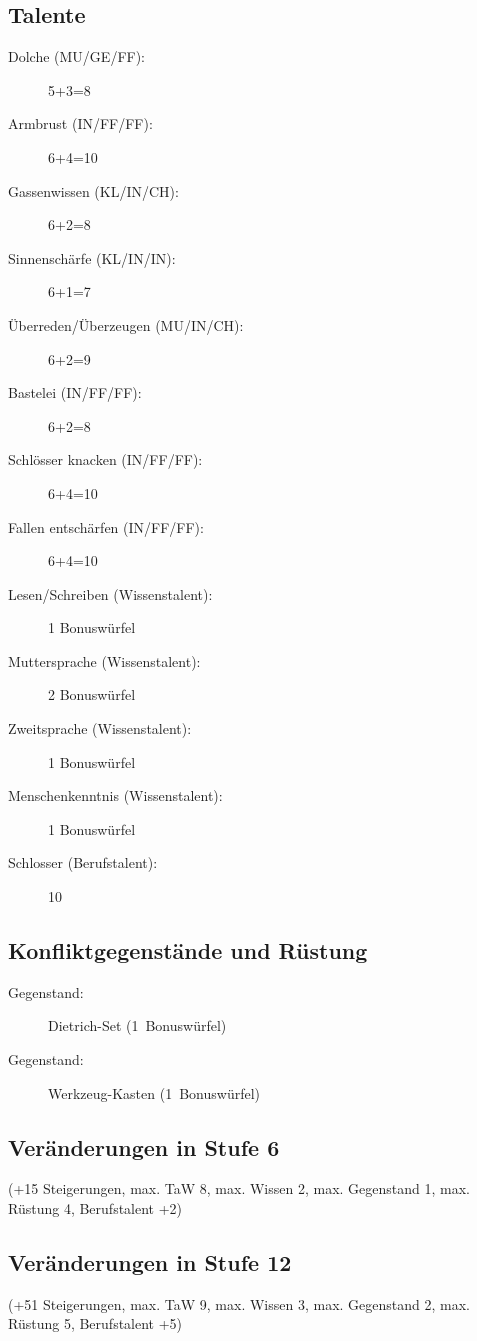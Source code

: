 \subsection{Talente}
\begin{description}
\item[Dolche (MU/GE/FF):] 5+3=8
\item[Armbrust (IN/FF/FF):] 6+4=10
\item[Gassenwissen (KL/IN/CH):] 6+2=8
\item[Sinnenschärfe (KL/IN/IN):] 6+1=7
\item[Überreden/Überzeugen (MU/IN/CH):] 6+2=9
\item[Bastelei (IN/FF/FF):] 6+2=8
\item[Schlösser knacken (IN/FF/FF):] 6+4=10
\item[Fallen entschärfen (IN/FF/FF):] 6+4=10
\item[Lesen/Schreiben (Wissenstalent):] 1 Bonuswürfel
\item[Muttersprache (Wissenstalent):] 2 Bonuswürfel
\item[Zweitsprache (Wissenstalent):] 1 Bonuswürfel
\item[Menschenkenntnis (Wissenstalent):] 1 Bonuswürfel
\item[Schlosser (Berufstalent):] 10
\end{description}

\subsection{Konfliktgegenstände und Rüstung}
\begin{description}
\item[Gegenstand:] Dietrich-Set (1~Bonuswürfel)
\item[Gegenstand:] Werkzeug-Kasten (1~Bonuswürfel)
\end{description}

\subsection{Veränderungen in Stufe 6}
(+15 Steigerungen, max. TaW 8, max. Wissen 2, max. Gegenstand 1, max. Rüstung 4, Berufstalent +2)

\subsection{Veränderungen in Stufe 12}
(+51 Steigerungen, max. TaW 9, max. Wissen 3, max. Gegenstand 2, max. Rüstung 5, Berufstalent +5)

